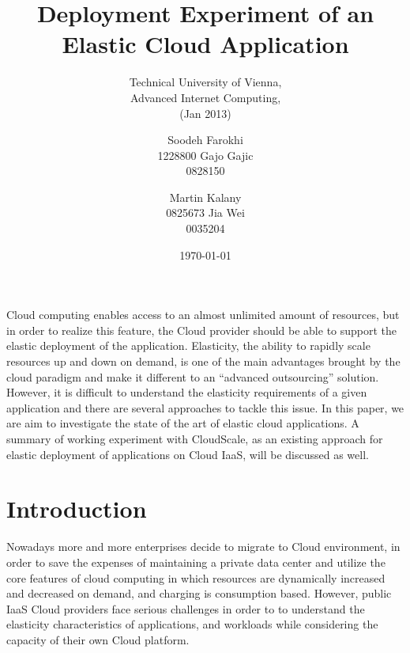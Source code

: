 \documentclass{sig-alternate}
\begin{document}
\title{Deployment Experiment of an Elastic Cloud Application}
\subtitle{Technical University of Vienna,\\Advanced Internet Computing,\\
(Jan 2013)}


\author{
\alignauthor
Soodeh Farokhi\\ %
       1228800
\alignauthor
Gajo Gajic\\
       0828150
\and
\alignauthor
Martin Kalany\\
       0825673
\alignauthor
Jia Wei\\
       0035204
}
       
\date{\today}

\maketitle
\begin{abstract}
\end{abstract}
Cloud computing enables access to an almost unlimited amount of resources, but in order to realize this feature, the Cloud provider should be able to support the elastic deployment of the application. Elasticity, the ability to rapidly scale resources up and down on demand, is one of the main advantages brought by the cloud paradigm and make it different to an “advanced outsourcing” solution.
However, it is difficult to understand the elasticity requirements of a given application and there are several approaches to tackle this issue. In this paper, we are aim to investigate the state of the art of elastic cloud applications. A summary of working experiment with CloudScale, as an existing approach for elastic deployment of applications on Cloud IaaS, will be discussed as well. \\

\section{Introduction}
Nowadays more and more enterprises decide to migrate to Cloud environment, in order to save the expenses of maintaining a private data center and utilize the core features of cloud computing in which resources are dynamically increased and decreased on demand, and charging is consumption based. However, public IaaS Cloud providers face serious challenges in order to to understand the elasticity characteristics of applications, and workloads while considering the capacity of their own Cloud platform. 
\end{document}
